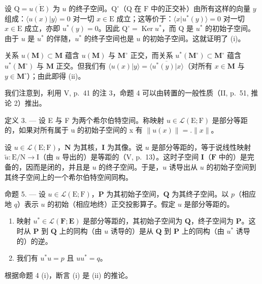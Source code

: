 设 \(\mathrm{Q} = \overline{u(\mathrm{E})}\) 为 \(u\) 的终子空间。\(\mathrm{Q}^{\circ}\)（\(\mathrm{Q}\) 在 \(\mathrm{F}\) 中的正交补）由所有这样的向量 \(y\) 组成：\(\langle u(x)|y\rangle = 0\) 对一切 \(x\in \mathrm{E}\) 成立；这等价于：\(\langle x|u^{*}(y)\rangle = 0\) 对一切 \(x\in \mathrm{E}\) 成立，亦即 \(u^{*}(y) = 0\)。因此 \(\mathrm{Q}^{\circ} = \operatorname{Ker}u^{*}\)，而 \(\mathrm{Q}\) 是 \(u^{*}\) 的初始子空间。由于 \(u\) 是 \(u^{*}\) 的伴随，\(u^{*}\) 的终子空间也是 \(u\) 的初始子空间。这就证明了 (i)。

关系 \(u(\mathbf{M}) \subset \mathbf{M}\) 蕴含 \(u(\mathbf{M})\) 与 \(\mathbf{M}^{\circ}\) 正交，而关系 \(u^{*}(\mathbf{M}^{\circ}) \subset \mathbf{M}^{\circ}\) 蕴含 \(u^{*}(\mathbf{M}^{\circ})\) 与 \(\mathbf{M}\) 正交。但我们有 \(\langle u(x)|y\rangle = \overline{\langle u^{*}(y)|x\rangle}\)（对所有 \(x \in \mathbf{M}\) 与 \(y \in \mathbf{M}^{\circ}\)）；由此即得 (ii)。

我们注意到，利用 V, p.~41 的注 3，命题 4 可以由转置的一般性质（II, p.~51, 推论 2）推出。

定义 3. --- 设 E 与 F 为两个希尔伯特空间。称映射 \(u \in \mathcal{L}(\mathrm{E};\mathrm{F})\) 是部分等距的，如果对所有属于 u 的初始子空间的 x 有 \(\|u(x)\| = .\|x\|\)。

设 \(u \in \mathcal{L}(\mathrm{E};\mathrm{F})\)，\(\mathbf{N}\) 为其核，\(\mathbf{I}\) 为其像。说 \(u\) 是部分等距的，等于说线性映射 \(\tilde{u}: \mathrm{E/N} \to \mathrm{I}\)（由 \(u\) 导出的）是等距的（V, p.~13）。这时子空间 \(\mathbf{I}\)（\(\mathbf{F}\) 中的）是完备的，因而是闭的，并且是 \(u\) 的终子空间。于是，\(u\) 诱导出从 \(u\) 的初始子空间到其终子空间上的一个希尔伯特空间同构。

命题 5. --- 设 \(u \in \mathcal{L}(\mathrm{E};\mathrm{F})\)，\(\mathbf{P}\) 为其初始子空间，\(\mathbf{Q}\) 为其终子空间。以 \(p\)（相应地 \(q\)）表示 \(u\) 的初始（相应地终）正交投影算子。假定 \(u\) 是部分等距的。

\begin{enumerate}
\def\labelenumi{(\roman{enumi})}
\item
  映射 \(u^{*} \in \mathcal{L}(\mathbf{F};\mathbf{E})\) 是部分等距的，其初始子空间为 \(\mathbf{Q}\)，终子空间为 \(\mathbf{P}\)。这时从 \(\mathbf{P}\) 到 \(\mathbf{Q}\) 上的同构（由 \(u\) 诱导的）是从 \(\mathbf{Q}\) 到 \(\mathbf{P}\) 上的同构（由 \(u^{*}\) 诱导的）的逆。
\item
  我们有 \(u^{*}u = p\) 且 \(uu^{*} = q\)。
\end{enumerate}

根据命题 4 (i)，断言 (i) 是 (ii) 的推论。

